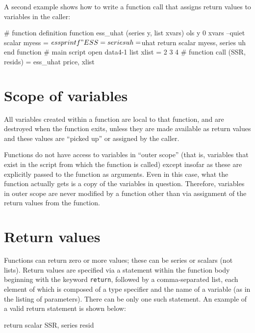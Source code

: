 A second example shows how to write a function call that assigns
return values to variables in the caller:
    
\begin{code}
      # function definition
      function ess_uhat (series y, list xvars)
        ols y 0 xvars --quiet
        scalar myess = $ess
        printf "ESS = %
        series uh = $uhat
        return scalar myess, series uh
      end function
      # main script
      open data4-1
      list xlist = 2 3 4
      # function call
      (SSR, resids) = ess_uhat price, xlist
\end{code}


\section{Scope of variables}
\label{func-scope}

All variables created within a function are local to that function,
and are destroyed when the function exits, unless they are made
available as return values and these values are ``picked up'' or
assigned by the caller.
    
Functions do not have access to variables in ``outer scope'' (that is,
variables that exist in the script from which the function is called)
except insofar as these are explicitly passed to the function as
arguments.  Even in this case, what the function actually gets is a
copy of the variables in question.  Therefore, variables in outer
scope are never modified by a function other than via assignment of
the return values from the function.
    

\section{Return values}
\label{func-return}


Functions can return zero or more values; these can be series or
scalars (not lists).  Return values are specified via a statement
within the function body beginning with the keyword \verb+return+,
followed by a comma-separated list, each element of which is composed
of a type specifier and the name of a variable (as in the listing of
parameters).  There can be only one such statement.  An example of a
valid return statement is shown below:
    
\begin{code}
      return scalar SSR, series resid
\end{code}

